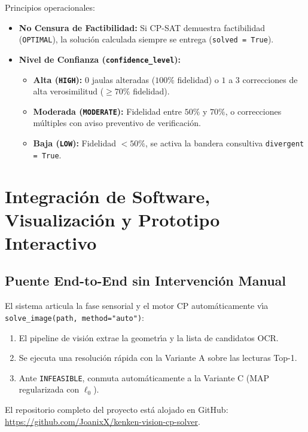 \documentclass[conference]{IEEEtran}
\begin{document}
Principios operacionales:
\begin{itemize}
    \item \textbf{No Censura de Factibilidad:} Si CP-SAT demuestra factibilidad (\texttt{OPTIMAL}), la soluci\'on calculada siempre se entrega (\texttt{solved = True}).
    \item \textbf{Nivel de Confianza (\texttt{confidence\_level}):}
    \begin{itemize}
        \item \textbf{Alta (\texttt{HIGH}):} $0$ jaulas alteradas ($100\%$ fidelidad) o $1$ a $3$ correcciones de alta verosimilitud ($\ge 70\%$ fidelidad).
        \item \textbf{Moderada (\texttt{MODERATE}):} Fidelidad entre $50\%$ y $70\%$, o correcciones m\'ultiples con aviso preventivo de verificaci\'on.
        \item \textbf{Baja (\texttt{LOW}):} Fidelidad $< 50\%$, se activa la bandera consultiva \texttt{divergent = True}.
    \end{itemize}
\end{itemize}

\section{Integraci\'on de Software, Visualizaci\'on y Prototipo Interactivo}
\label{sec:integration}

\subsection{Puente End-to-End sin Intervenci\'on Manual}
El sistema articula la fase sensorial y el motor CP autom\'aticamente v\'{\i}a \texttt{solve\_image(path, method="auto")}:
\begin{enumerate}
    \item El pipeline de visi\'on extrae la geometr\'{\i}a y la lista de candidatos OCR.
    \item Se ejecuta una resoluci\'on r\'apida con la Variante A sobre las lecturas Top-1.
    \item Ante \texttt{INFEASIBLE}, conmuta autom\'aticamente a la Variante C (MAP regularizada con $\ell_0$).
\end{enumerate}

El repositorio completo del proyecto est\'a alojado en GitHub: \url{https://github.com/JoanixX/kenken-vision-cp-solver}.
\end{document}
